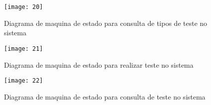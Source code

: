 \begin{figure}[h]
  \caption{Diagrama de maquina de estado para consulta de tipos de teste no sistema}
  \centering
  \texttt{[image: 20]}
\end{figure}
\FloatBarrier

\begin{figure}[h]
  \caption{Diagrama de maquina de estado para realizar teste no sistema}
  \centering
  \texttt{[image: 21]}
\end{figure}
\FloatBarrier

\begin{figure}[h]
  \caption{Diagrama de maquina de estado para consulta de teste no sistema}
  \centering
  \texttt{[image: 22]}
\end{figure}
\FloatBarrier
